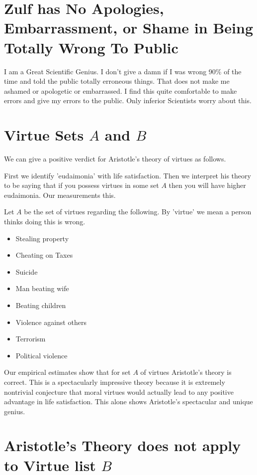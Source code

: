 \documentclass{amsart}
\begin{document}
\section{Zulf has No Apologies, Embarrassment, or Shame in Being Totally Wrong To Public}

I am a Great Scientific Genius.  I don't give a damn if I was wrong 90\% of the time and told the public totally erroneous things.  That does not make me ashamed or apologetic or embarrassed.  I find this quite comfortable to make errors and give my errors to the public.  Only inferior Scientists worry about this.


\section{Virtue Sets $A$ and $B$}

We can give a positive verdict for Aristotle's theory of virtues as follows.

First we identify 'eudaimonia' with life satisfaction.  Then we interpret his theory to be saying that if you possess virtues in some set $A$ then you will have higher eudaimonia. Our measurements this.

Let $A$ be the set of virtues regarding the following.  By 'virtue' we mean a person thinks doing this is wrong.

\begin{itemize}
\item{Stealing property}
\item{Cheating on Taxes}
\item{Suicide}
\item{Man beating wife}
\item{Beating children}
\item{Violence against others}
\item{Terrorism}
\item{Political violence}
\end{itemize}

Our empirical estimates show that for set $A$ of virtues Aristotle's theory is correct.  This is a spectacularly impressive theory because it is extremely nontrivial conjecture that moral virtues would actually lead to any positive advantage in life satisfaction.  This alone shows Aristotle's spectacular and unique genius.  

\section{Aristotle's Theory does not apply to Virtue list $B$}
\end{document}
